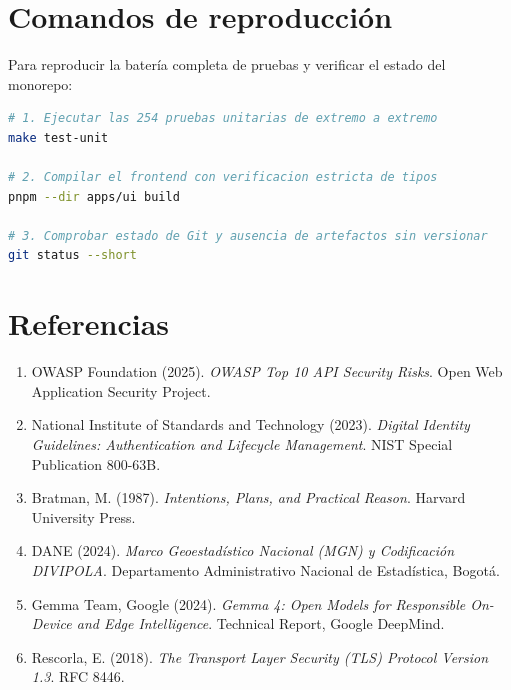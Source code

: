 \documentclass[11pt,a4paper]{article}
\begin{document}
\section{Comandos de reproducci\'on}

Para reproducir la bater\'ia completa de pruebas y verificar el estado del monorepo:

\begin{lstlisting}[language=bash, caption={Instrucciones de verificaci\'on local.}]
# 1. Ejecutar las 254 pruebas unitarias de extremo a extremo
make test-unit

# 2. Compilar el frontend con verificacion estricta de tipos
pnpm --dir apps/ui build

# 3. Comprobar estado de Git y ausencia de artefactos sin versionar
git status --short
\end{lstlisting}

\section{Referencias}
\begin{enumerate}[leftmargin=*]
    \item OWASP Foundation (2025). \textit{OWASP Top 10 API Security Risks}. Open Web Application Security Project.
    \item National Institute of Standards and Technology (2023). \textit{Digital Identity Guidelines: Authentication and Lifecycle Management}. NIST Special Publication 800-63B.
    \item Bratman, M. (1987). \textit{Intentions, Plans, and Practical Reason}. Harvard University Press.
    \item DANE (2024). \textit{Marco Geoestad\'istico Nacional (MGN) y Codificaci\'on DIVIPOLA}. Departamento Administrativo Nacional de Estad\'istica, Bogot\'a.
    \item Gemma Team, Google (2024). \textit{Gemma 4: Open Models for Responsible On-Device and Edge Intelligence}. Technical Report, Google DeepMind.
    \item Rescorla, E. (2018). \textit{The Transport Layer Security (TLS) Protocol Version 1.3}. RFC 8446.
\end{enumerate}
\end{document}
